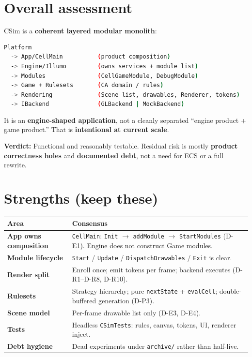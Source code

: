 \documentclass[10pt,a4paper]{article}
\begin{document}
\section{Overall assessment}
CSim is a \textbf{coherent layered modular monolith}:

\begin{lstlisting}[language=bash]
Platform
  -> App/CellMain          (product composition)
  -> Engine/Illumo         (owns services + module list)
  -> Modules               (CellGameModule, DebugModule)
  -> Game + Rulesets       (CA domain / rules)
  -> Rendering             (Scene list, drawables, Renderer, tokens)
  -> IBackend              (GLBackend | MockBackend)
\end{lstlisting}

It is an \textbf{engine-shaped application}, not a cleanly separated ``engine product + game product.'' That is \textbf{intentional at current scale}.

\noindent \textbf{Verdict:} Functional and reasonably testable. Residual risk is mostly \textbf{product correctness holes} and \textbf{documented debt}, not a need for ECS or a full rewrite.

\section{Strengths (keep these)}
\begin{table}[h!]
\centering
\small
\begin{tabularx}{\textwidth}{l X}
\toprule
\textbf{Area} & \textbf{Consensus} \\
\midrule
\textbf{App owns composition} & \texttt{CellMain}: \texttt{Init} $\rightarrow$ \texttt{addModule} $\rightarrow$ \texttt{StartModules} (D-E1). Engine does not construct Game modules. \\
\textbf{Module lifecycle} & \texttt{Start} / \texttt{Update} / \texttt{DispatchDrawables} / \texttt{Exit} is clear. \\
\textbf{Render split} & Enroll once; emit tokens per frame; backend executes (D-R1--D-R8, D-R10). \\
\textbf{Rulesets} & Strategy hierarchy; pure \texttt{nextState} + \texttt{evalCell}; double-buffered generation (D-P3). \\
\textbf{Scene model} & Per-frame drawable list only (D-E3, D-E4). \\
\textbf{Tests} & Headless \texttt{CSimTests}: rules, canvas, tokens, UI, renderer inject. \\
\textbf{Debt hygiene} & Dead experiments under \texttt{archive/} rather than half-live. \\
\bottomrule
\end{tabularx}
\end{table}
\end{document}
